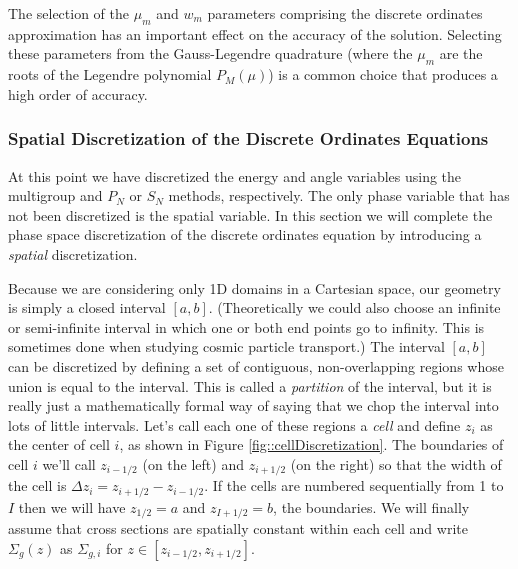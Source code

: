 \documentclass[11pt]{article}
\begin{document}
The selection of the \(\mu_m\) and \(w_m\) parameters comprising the discrete ordinates approximation has an important effect on the accuracy of the solution.  Selecting these parameters from the Gauss-Legendre quadrature (where the \(\mu_m\) are the roots of the Legendre polynomial \(P_M(\mu)\)) is a common choice that produces a high order of accuracy.
\subsubsection{Spatial Discretization of the Discrete Ordinates Equations}
\label{sec:orgheadline55}
At this point we have discretized the energy and angle variables using the multigroup and \(P_N\) or \(S_N\) methods, respectively.  The only phase variable that has not been discretized is the spatial variable.  In this section we will complete the phase space discretization of the discrete ordinates equation by introducing a \emph{spatial} discretization.

Because we are considering only 1D domains in a Cartesian space, our geometry is simply a closed interval \([a,b]\).  (Theoretically we could also choose an infinite or semi-infinite interval in which one or both end points go to infinity.  This is sometimes done when studying cosmic particle transport.)  The interval \([a,b]\) can be discretized by defining a set of contiguous, non-overlapping regions whose union is equal to the interval.  This is called a \emph{partition} of the interval, but it is really just a mathematically formal way of saying that we chop the interval into lots of little intervals.  Let's call each one of these regions a \emph{cell} and define \(z_i\) as the center of cell \(i\), as shown in Figure \ref{fig::cellDiscretization}.  The boundaries of cell \(i\) we'll call \(z_{i-1/2}\) (on the left) and \(z_{i+1/2}\) (on the right) so that the width of the cell is \(\Delta z_i = z_{i+1/2} - z_{i-1/2}\).  If the cells are numbered sequentially from 1 to \(I\) then we will have \(z_{1/2} = a\) and \(z_{I+1/2} = b\), the boundaries.  We will finally assume that cross sections are spatially constant within each cell and write \(\Sigma_g(z)\) as \(\Sigma_{g,i}\) for \(z \in [z_{i-1/2},z_{i+1/2}]\).
\end{document}
